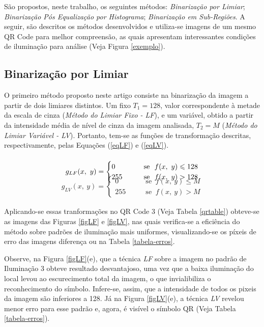\documentclass{ceel}
\begin{document}
\begin{multicols}{2}
São propostos, neste trabalho, os seguintes métodos: \emph{Binarização por Limiar}; \emph{Binarização Pós Equalização por Histograma}; \emph{Binarização em Sub-Regiões}. A seguir, são descritos os métodos desenvolvidos e utiliza-se imagens de um mesmo QR Code para melhor compreensão, as quais apresentam interessantes condições de iluminação para análise (Veja Figura \ref{exemplo}).


\subsection{Binarização por Limiar} \label{Aconst}
O primeiro método proposto neste artigo consiste na binarização da imagem a partir de dois limiares distintos. Um fixo $T_1=128$, valor correspondente à metade da escala de cinza (\textit{Método do Limiar Fixo - LF}), e um variável, obtido a partir da intensidade média de nível de cinza da imagem analisada, $T_2=M$  (\textit{Método do Limiar Variável - LV}). Portanto, tem-se as funções de transformação descritas, respectivamente, pelas Equações (\ref{eqLF}) e (\ref{eqLV}).


\begin{gather}
\vspace{-1cm}
g_{LF}( x,\ y) =\begin{cases}
0 & \quad \quad \text{se }\ f( x,\ y) \leqslant 128\\
255 & \quad \quad \text{se }\ f( x,\ y)  >128
\end{cases}
\label{eqLF}
\end{gather}

\begin{gather}
g_{LV}( x,\ y) =\begin{cases}
0 & \quad \quad \text{se }\ f( x,\ y) \leqslant M\\
255 & \quad \quad \text{se }\ f( x,\ y)  >M
\end{cases}
\label{eqLV}
\end{gather}

Aplicando-se essas tranformações no QR Code 3 (Veja Tabela \ref{qrtable}) obteve-se as imagens das Figuras \ref{figLF} e \ref{figLV}, nas quais verifica-se a eficiência do método sobre padrões de iluminação mais uniformes, visualizando-se os píxeis de erro das imagens diferença ou na Tabela \ref{tabela-erros}.



\vspace{0.25cm}
Observe, na Figura \ref{figLF}(e), que a técnica \emph{LF} sobre a imagem no padrão de Iluminação 3 obteve resultado desvantajoso, uma vez que a baixa iluminação do local levou ao escurecimento total da imagem, o que invialibiliza o reconhecimento do símbolo. Infere-se, assim, que a intensidade de todos os pixeis da imagem são inferiores a 128. Já na Figura \ref{figLV}(e), a técnica \emph{LV} revelou menor erro para esse padrão e, agora, é visível o símbolo QR (Veja Tabela \ref{tabela-erros}). 


\end{multicols}
\end{document}
